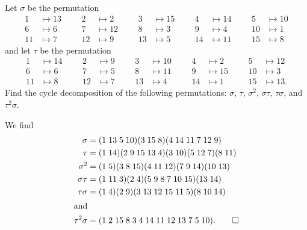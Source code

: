 \label{exercise:intro-group:perm2}
Let $\sigma$ be the permutation
\begin{align*}
  1 &\mapsto 13 &&& 2 &\mapsto 2 &&& 3 &\mapsto 15 &&& 4 &\mapsto 14
  &&& 5 &\mapsto 10 \\
  6 &\mapsto 6 &&& 7 &\mapsto 12 &&& 8 &\mapsto 3 &&& 9 &\mapsto 4
  &&& 10 &\mapsto 1 \\
  11 &\mapsto 7 &&& 12 &\mapsto 9 &&& 13 &\mapsto 5 &&& 14 &\mapsto 11
  &&& 15 &\mapsto 8
\end{align*}
and let $\tau$ be the permutation
\begin{align*}
  1 &\mapsto 14 &&& 2 &\mapsto 9 &&& 3 &\mapsto 10 &&& 4 &\mapsto 2
  &&& 5 &\mapsto 12 \\
  6 &\mapsto 6 &&& 7 &\mapsto 5 &&& 8 &\mapsto 11 &&& 9 &\mapsto 15
  &&& 10 &\mapsto 3 \\
  11 &\mapsto 8 &&& 12 &\mapsto 7 &&& 13 &\mapsto 4 &&& 14 &\mapsto 1
  &&& 15 &\mapsto 13.
\end{align*}
Find the cycle decomposition of the following permutations: $\sigma$,
$\tau$, $\sigma^2$, $\sigma\tau$, $\tau\sigma$, and $\tau^2\sigma$.
\begin{solution}
  We find
  \begin{align*}
    \sigma &= (1\;13\;5\;10)(3\;15\;8)(4\;14\;11\;7\;12\;9) \\
    \tau &= (1\;14)(2\;9\;15\;13\;4)(3\;10)(5\;12\;7)(8\;11) \\
    \sigma^2 &= (1\;5)(3\;8\;15)(4\;11\;12)(7\;9\;14)(10\;13) \\
    \sigma\tau &= (1\;11\;3)(2\;4)(5\;9\;8\;7\;10\;15)(13\;14) \\
    \tau\sigma &= (1\;4)(2\;9)(3\;13\;12\;15\;11\;5)(8\;10\;14) \\
    \intertext{and}
    \tau^2\sigma &= (1\;2\;15\;8\;3\;4\;14\;11\;12\;13\;7\;5\;10).
                   \qedhere
  \end{align*}
\end{solution}

